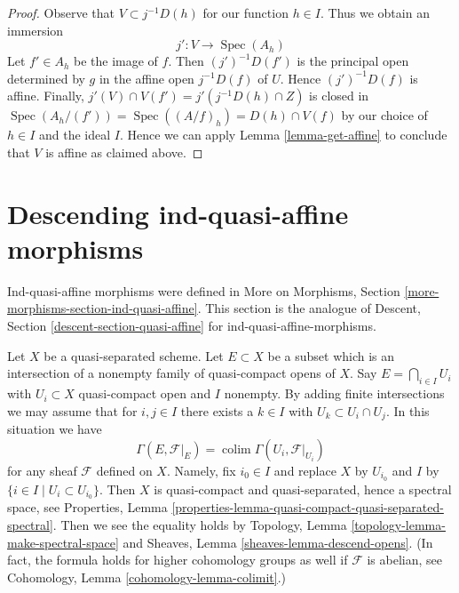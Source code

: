 \documentclass{stacks-project}
\theoremstyle{plain}
\theoremstyle{definition}
\theoremstyle{remark}
\numberwithin{equation}{subsection}
\def\colim{\mathop{\mathrm{colim}}\nolimits}
\def\Spec{\mathop{\mathrm{Spec}}}
\begin{document}
\begin{proof}
\medskip\noindent
Observe that $V \subset j^{-1}D(h)$ for our function $h \in I$.
Thus we obtain an immersion
$$
j' : V \longrightarrow \Spec(A_h)
$$
Let $f' \in A_h$ be the image of $f$. Then $(j')^{-1}D(f')$
is the principal open determined by $g$ in the affine
open $j^{-1}D(f)$ of $U$.
Hence $(j')^{-1}D(f)$ is affine. Finally,
$j'(V) \cap V(f') = j'(j^{-1}D(h) \cap Z)$
is closed in $\Spec(A_h/(f')) = \Spec((A/f)_h) = D(h) \cap V(f)$
by our choice of $h \in I$ and the ideal $I$. Hence we can apply
Lemma \ref{lemma-get-affine}
to conclude that $V$ is affine as claimed above.
\end{proof}







\section{Descending ind-quasi-affine morphisms}
\label{section-ind-quasi-affine}

\noindent
Ind-quasi-affine morphisms were defined in
More on Morphisms, Section \ref{more-morphisms-section-ind-quasi-affine}.
This section is the analogue of
Descent, Section \ref{descent-section-quasi-affine}
for ind-quasi-affine-morphisms.

\medskip\noindent
Let $X$ be a quasi-separated scheme. Let $E \subset X$ be a subset
which is an intersection of a nonempty family of quasi-compact opens of $X$.
Say $E = \bigcap_{i \in I} U_i$ with $U_i \subset X$ quasi-compact open
and $I$ nonempty.
By adding finite intersections we may assume that for $i, j \in I$
there exists a $k \in I$ with $U_k \subset U_i \cap U_j$.
In this situation we have
\begin{equation}
\label{equation-sections-of-intersection}
\Gamma(E, \mathcal{F}|_E) = \colim \Gamma(U_i, \mathcal{F}|_{U_i})
\end{equation}
for any sheaf $\mathcal{F}$ defined on $X$. Namely, fix $i_0 \in I$
and replace $X$ by $U_{i_0}$ and $I$ by
$\{i \in I \mid U_i \subset U_{i_0}\}$. Then $X$ is quasi-compact
and quasi-separated, hence a spectral space, see
Properties, Lemma
\ref{properties-lemma-quasi-compact-quasi-separated-spectral}.
Then we see the equality holds by
Topology, Lemma \ref{topology-lemma-make-spectral-space} and
Sheaves, Lemma \ref{sheaves-lemma-descend-opens}.
(In fact, the formula holds for higher cohomology groups
as well if $\mathcal{F}$ is abelian, see
Cohomology, Lemma \ref{cohomology-lemma-colimit}.)
\end{document}
